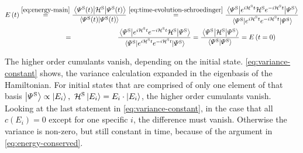 \begin{equation}
    \label{eq:energy-conserved}
    \begin{split}
        \energyOft &\stackrel{\ref{eq:energy-main}}{=}
        \frac{\bracketHelper{\psiOfT[\schroedingerPicture]}{\pictureHamiltonian[\schroedingerPicture]}{\psiOfT[\schroedingerPicture]}}{\braketHelper{\psiOfT[\schroedingerPicture]}{\psiOfT[\schroedingerPicture]}}
        \stackrel{\ref{eq:time-evolution-schroedinger}}{=}
        \frac{\bracketHelper{\picturePsi[\schroedingerPicture]{}}{e^{i \pictureHamiltonian[\schroedingerPicture] t}{\pictureHamiltonian[\schroedingerPicture]}e^{-i \pictureHamiltonian[\schroedingerPicture] t}}{\picturePsi[\schroedingerPicture]{}}}{\bracketHelper{\picturePsi[\schroedingerPicture]{}}{e^{i \pictureHamiltonian[\schroedingerPicture] t}e^{-i \pictureHamiltonian[\schroedingerPicture] t}}{\picturePsi[\schroedingerPicture]{}}}\\
        &\stackrel{\phantom{\ref{eq:time-evolution-schroedinger}}}{=}
        \frac{\bracketHelper{\picturePsi[\schroedingerPicture]{}}{e^{i \pictureHamiltonian[\schroedingerPicture] t}e^{-i \pictureHamiltonian[\schroedingerPicture] t}{\pictureHamiltonian[\schroedingerPicture]}}{\picturePsi[\schroedingerPicture]{}}}{\bracketHelper{\picturePsi[\schroedingerPicture]{}}{e^{i \pictureHamiltonian[\schroedingerPicture] t}e^{-i \pictureHamiltonian[\schroedingerPicture] t}}{\picturePsi[\schroedingerPicture]{}}} = 
        \frac{\bracketHelper{\picturePsi[\schroedingerPicture]{}}{\pictureHamiltonian[\schroedingerPicture]}{\picturePsi[\schroedingerPicture]{}}}{\braketHelper{\picturePsi[\schroedingerPicture]{}}{\picturePsi[\schroedingerPicture]{}}}
         = \energyOft[t=0]
    \end{split}
\end{equation}

The higher order cumulants vanish, depending on the initial state. 
\autoref{eq:variance-constant} shows, the variance calculation expanded in the eigenbasis of the Hamiltonian.
For initial states that are comprised of only one element of that basis $\ketN[{\picturePsi[\schroedingerPicture]{}}] \propto \ketN[E_i],\,\,\pictureHamiltonian[\schroedingerPicture]\ketN[E_i] = E_i\cdot\ketN[E_i]$, the higher order cumulants vanish. 
Looking at the last statement in \autoref{eq:variance-constant}, in the case that all $c(E_i) = 0$ except for one specific $i$, the difference must vanish.
Otherwise the variance is non-zero, but still constant in time, because of the argument in \autoref{eq:energy-conserved}.

